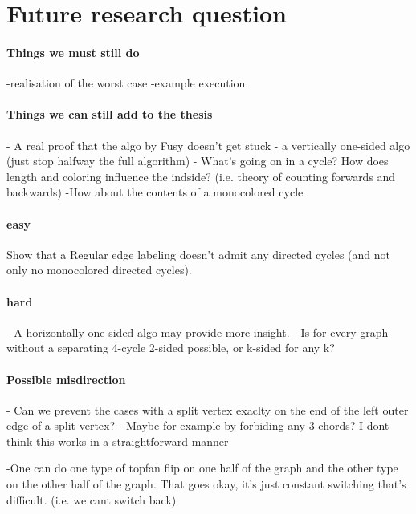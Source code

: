 \section{Future research question}

\paragraph{Things we must still do}
-realisation of the worst case
-example execution


\paragraph{Things we can still add to the thesis}
- A real proof that the algo by Fusy doesn't get stuck
- a vertically one-sided algo (just stop halfway the full algorithm)
- What's going on in a cycle? How does length and coloring influence the indside? (i.e. theory of counting forwards and backwards)
  -How about the contents of a monocolored cycle

\paragraph{easy}
Show that a Regular edge labeling doesn't admit any directed cycles (and not only no monocolored directed cycles).

\paragraph{hard}
- A horizontally one-sided algo may provide more insight.
- Is for every graph without a separating 4-cycle 2-sided possible, or k-sided for any k?

\paragraph{Possible misdirection}
- Can we prevent the cases with a split vertex exaclty on the end of the left outer edge of a split vertex?
      - Maybe for example by forbiding any 3-chords? I dont think this works in a straightforward manner

-One can do one type of topfan flip on one half of the graph and the other type on the other half of the graph. That goes okay, it's just constant switching that's difficult. (i.e. we cant switch back)
